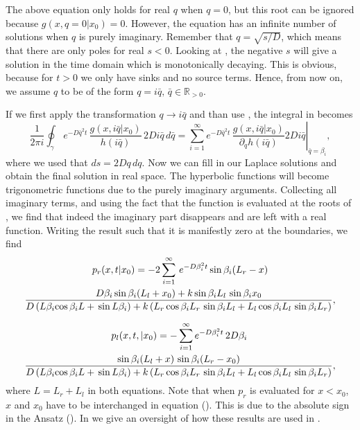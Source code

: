 The above equation only holds for real $q$ when $q = 0$, but this root can be ignored because $g(x,q=0|x_0) = 0$. However, the equation has an infinite number of solutions when $q$ is purely imaginary. Remember that $q = \sqrt{s/D}$, which means that there are only poles for real $s < 0$. Looking at , the negative $s$ will give a solution in the time domain which is monotonically decaying. This is obvious, because for $t > 0$ we only have sinks and no source terms. Hence, from now on, we assume $q$ to be of the form $q = i \bar{q}, \, \bar{q} \in \mathbb{R}_{>0}$.

If we first apply the transformation $q \rightarrow i \bar{q}$ and than use , the integral in  becomes
\begin{equation} 
 \frac{1}{2 \pi i} \oint_{\gamma}
 \, e^{- D \bar{q}^2 t} \, \frac{g(x,i \bar{q}|x_0)}{h(i \bar{q})} \, 2 D i \bar{q} \, d\bar{q} = \sum_{i=1}^{\infty} e^{ - D \bar{q}^2 t} \, \left. \frac{g(x,i \bar{q}|x_0)}{\partial_q h(i \bar{q})} 2 D i \bar{q} \right|_{\bar{q} = \beta_i},
\end{equation}
where we used that $ds = 2Dq\,dq$. Now we can fill in our Laplace solutions and obtain the final solution in real space. The hyperbolic functions will become trigonometric functions due to the purely imaginary arguments. Collecting all imaginary terms, and using the fact that the function is evaluated at the roots of , we find that indeed the imaginary part disappears and are left with a real function. Writing the result such that it is manifestly zero at the boundaries, we find
\begin{multline}
 p_r(x,t|x_0) = -2 \sum_{i=1}^{\infty} \, e^{- D \beta_i ^2 t} \, \mathrm{sin} \, \beta_i (L_r - x) \\ 
\frac{D \beta_i \, \mathrm{sin} \, \beta_i (L_l + x_0) + k \, \mathrm{sin} \, \beta_i L_l \,\, \mathrm{sin} \, \beta_i x_0}{D \, (L \beta_i \mathrm{cos} \, \beta_i L + \, \mathrm{sin} \, L \beta_i ) + k \,( L_r \, \mathrm{cos} \, \beta_i L_r \,\, \mathrm{sin} \, \beta_i L_l + L_l \, \mathrm{cos} \, \beta_i L_l \,\, \mathrm{sin} \, \beta_i L_r )},
 \elabel{FSOL_R}
\end{multline}

\begin{multline}
 p_l(x,t,|x_0) = -\sum_{i=1}^{\infty} e^{- D \beta_i ^2 t} \, 2 D \beta_i \, \\ 
\frac{\mathrm{sin} \, \beta_i (L_l + x) \,\, \mathrm{sin} \, \beta_i (L_r - x_0)}{D \, (L \beta_i \mathrm{cos} \, \beta_i L + \, \mathrm{sin} \, L \beta_i ) + k \,( L_r \, \mathrm{cos} \, \beta_i L_r \,\, \mathrm{sin} \, \beta_i L_l + L_l \, \mathrm{cos} \, \beta_i L_l \,\, \mathrm{sin} \, \beta_i L_r )},
\elabel{FSOL_L}
\end{multline}
where $L=L_r + L_l$ in both equations. Note that when $p_r$ is evaluated for $x<x_0$, $x$ and $x_0$ have to be interchanged in equation (). This is due to the absolute sign in the Ansatz (). In  we give an oversight of how these results are used in \GFRD.


